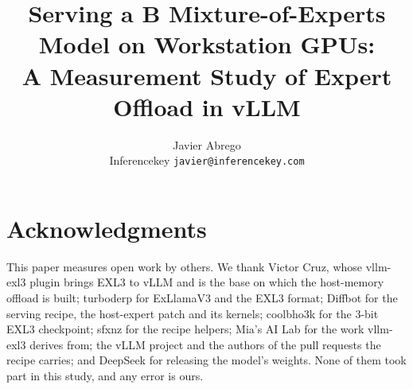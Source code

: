 \documentclass[10pt,a4paper]{article}
\title{Serving a \dv{hub.orig.params_b}B Mixture-of-Experts Model on Workstation GPUs:\\
\large A Measurement Study of Expert Offload in vLLM}
\author{Javier Abrego\\ \small Inferencekey \quad \texttt{javier@inferencekey.com}}
\date{}
\begin{document}
\maketitle



















\section*{Acknowledgments}
This paper measures open work by others. We thank Victor Cruz, whose vllm-exl3 plugin brings EXL3 to vLLM and is the
base on which the host-memory offload is built; turboderp for ExLlamaV3 and the EXL3 format; Diffbot for the serving
recipe, the host-expert patch and its kernels; coolbho3k for the 3-bit EXL3 checkpoint; sfxnz for the recipe helpers;
Mia's AI Lab for the work vllm-exl3 derives from; the vLLM project and the authors of the pull requests the recipe
carries; and DeepSeek for releasing the model's weights. None of them took part in this study, and any error is ours.




\appendix

\end{document}
